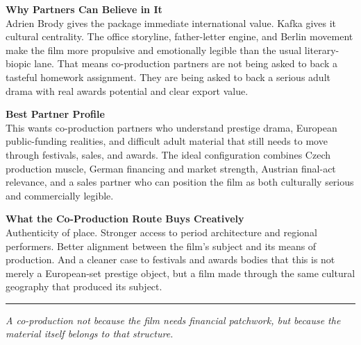 \documentclass[11pt,letterpaper]{article}
\begin{document}
\vspace{2pt}

\textbf{Why Partners Can Believe in It}\\
Adrien Brody gives the package immediate international value. Kafka gives it cultural centrality. The office storyline, father-letter engine, and Berlin movement make the film more propulsive and emotionally legible than the usual literary-biopic lane. That means co-production partners are not being asked to back a tasteful homework assignment. They are being asked to back a serious adult drama with real awards potential and clear export value.

\vspace{2pt}

\textbf{Best Partner Profile}\\
This wants co-production partners who understand prestige drama, European public-funding realities, and difficult adult material that still needs to move through festivals, sales, and awards. The ideal configuration combines Czech production muscle, German financing and market strength, Austrian final-act relevance, and a sales partner who can position the film as both culturally serious and commercially legible.

\vspace{2pt}

\textbf{What the Co-Production Route Buys Creatively}\\
Authenticity of place. Stronger access to period architecture and regional performers. Better alignment between the film's subject and its means of production. And a cleaner case to festivals and awards bodies that this is not merely a European-set prestige object, but a film made through the same cultural geography that produced its subject.

\vspace{4pt}
\textcolor{sectionrule}{\rule{\textwidth}{0.5pt}}
\vspace{2pt}
\begin{center}
{\small\color{kafkalight}\textit{A co-production not because the film needs financial patchwork, but because the material itself belongs to that structure.}}
\end{center}
\end{document}
